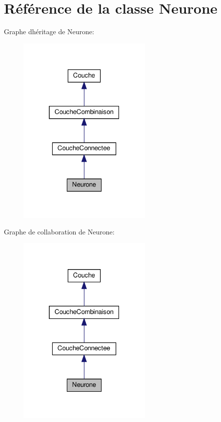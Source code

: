 \hypertarget{classNeurone}{}\section{Référence de la classe Neurone}
\label{classNeurone}


Graphe d\textquotesingle{}héritage de Neurone\+:
\nopagebreak
\begin{figure}[H]
\begin{center}
\leavevmode
\includegraphics[width=187pt]{classNeurone__inherit__graph}
\end{center}
\end{figure}


Graphe de collaboration de Neurone\+:
\nopagebreak
\begin{figure}[H]
\begin{center}
\leavevmode
\includegraphics[width=187pt]{classNeurone__coll__graph}
\end{center}
\end{figure}
